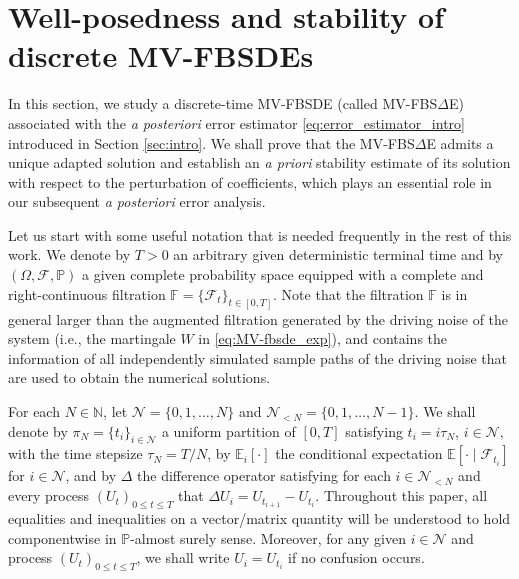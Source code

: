 \documentclass[11pt]{article}
\numberwithin{equation}{section}
\theoremstyle{definition}
\theoremstyle{remark}
\def\Om{\Omega}  \def\om{\omega} %
\def\l{\label}  \def\f{\frac}  \def\fa{\forall}
\def\cF{\mathcal{F}}
\def\cN{\mathcal{N}}
\def\sE{{\mathbb{E}}}
\def\sF{{\mathbb{F}}}
\def\sN{{\mathbb{N}}}
\def\sP{\mathbb{P}}
\newcommand{\fbsde}{FBS$\Delta$E }
\begin{document}
\section{Well-posedness and stability of discrete MV-FBSDEs}\l{sec:fbsde}

In this section, we  study a discrete-time MV-FBSDE (called MV-FBS$\Delta$E)
associated with the \textit{a posteriori} error estimator 
\eqref{eq:error_estimator_intro} introduced in Section \ref{sec:intro}.
We shall prove that the MV-\fbsde admits a unique adapted solution and 
establish an \textit{a priori} stability estimate of  its solution with respect to the perturbation of coefficients,
which plays an essential role in our subsequent \textit{a posteriori} error analysis. 

Let us start with some useful notation that is needed frequently in the rest of this work.
We denote by 
 $T>0$  an arbitrary given deterministic terminal time
and by $(\Om, \cF,  \sP)$
 a given complete probability space
equipped with a complete and right-continuous filtration $\sF=\{\cF_t\}_{t\in [0, T]}$.
Note that the filtration $\sF$ 
 is in general larger than 
the augmented filtration generated by the   driving noise of the system (i.e., the martingale $W$ in \eqref{eq:MV-fbsde_exp}),
and contains the information of all independently simulated sample paths of the  driving noise
that are used to obtain the numerical solutions. 

 For each
$N\in \sN$,
let 
$\cN=\{0,1,\ldots,N \}$
and
$\cN_{<N}=\{0,1,\ldots,N-1 \}$.
We shall denote by
$\pi_N=\{t_i \}_{i\in \cN}$
 a uniform  partition of $[0,T]$
satisfying $t_i=i\tau_N$, $i\in \cN$,
with the time stepsize $\tau_N=T/N$,\footnotemark
 by
$\sE_i[\cdot]$ the conditional expectation 
$\sE[\cdot\mid \cF_{t_i}]$
for $i\in\cN$,
and by $\Delta$ the difference operator 
satisfying for each $i\in \cN_{<N}$ and  
every process $(U_t)_{0\le t\le T}$   that
$\Delta U_{i} = U_{t_{i+1}}- U_{t_i}$.
Throughout this paper, 
 all equalities and inequalities 
on a vector/matrix quantity 
will be 
understood
to hold componentwise in $\sP$-almost surely sense.
Moreover,
for any given  $i\in \cN$
and  process $(U_t)_{0\le t\le T}$,
we shall  write $U_i=U_{t_i}$
if no confusion  occurs.

\end{document}
